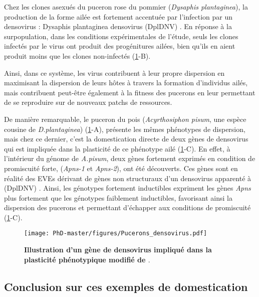 Chez les clones asexués du puceron rose du pommier (\textit{Dysaphis plantaginea}), la production de la forme ailée est fortement accentuée par l'infection par un densovirus : Dysaphis plantaginea densovirus (DplDNV) \citep{ryabov_densovirus_2009}. En réponse à la surpopulation, dans les conditions expérimentales de l'étude, seuls les clones infectés par le virus ont produit des progénitures ailées, bien qu'ils en aient produit moins que les clones non-infectés \citep{ryabov_densovirus_2009}(\figurename{\ref{figure:Pucerons_densovirus}}-B). 

Ainsi, dans ce système, les virus contribuent à leur propre  dispersion en maximisant la dispersion de leurs hôtes à travers la formation d'individus ailés, mais contribuent peut-être également à la fitness des pucerons en leur permettant de se reproduire sur de nouveaux patchs de ressources. 

De manière remarquable, le puceron du pois (\textit{Acyrthosiphon pisum}, une espèce cousine de \textit{D.plantaginea}) (\figurename{\ref{figure:Pucerons_densovirus}}-A), présente les mêmes phénotypes de dispersion, mais chez ce dernier, c'est la domestication directe de deux gènes de densovirus qui est impliquée dans la plasticité de ce phénotype ailé\citep{parker_laterally_2019} (\figurename{\ref{figure:Pucerons_densovirus}}-C). En effet, à l'intérieur du génome de \textit{A.pisum}, deux gènes fortement exprimés en condition de promiscuité forte, (\textit{Apns-1} et \textit{Apns-2}), ont été découverts. Ces gènes sont en réalité des EVEs dérivant de gènes non structuraux d'un densovirus apparenté à (DplDNV) \citep{parker_laterally_2019}. Ainsi, les génotypes fortement inductibles expriment les gènes \textit{Apns} plus fortement que les génotypes faiblement inductibles, favorisant ainsi la dispersion des pucerons et permettant d'échapper aux conditions de promiscuité (\figurename{\ref{figure:Pucerons_densovirus}}-C).


\begin{figure}[!htpbt]
\captionsetup{font=footnotesize}
 \centering
  \texttt{[image: PhD-master/figures/Pucerons\_densovirus.pdf]}
\caption[Intro:Illustration d'un gène de densovirus impliqué dans la plasticité phénotypique chez le puceron]{\textbf{Illustration d'un gène de densovirus impliqué dans la plasticité phénotypique modifié de \cite{parker_laterally_2019}}.}
\label{figure:Pucerons_densovirus}
\end{figure}


\subsection{Conclusion sur ces exemples de domestication}

